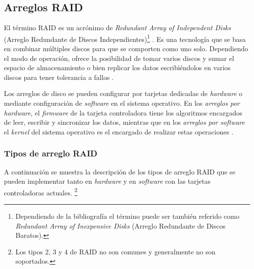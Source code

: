 \newpage
  \subsection {Arreglos RAID}
  \label{Arreglos-RAID}

El t\'{e}rmino \textsc{\gls{RAID}} es un acr\'{o}nimo de \emph{Redundant Array of Independent Disks} (Arreglo Redundante de Discos Independientes)\footnote{Dependiendo de la bibliograf\'{i}a el t\'{e}rmino puede ser tambi\'{e}n referido como \emph{Redundant Array of Inexpensive Disks} (Arreglo Redundante de Discos Baratos).} \cite{_bytepile.com_????}. Es una tecnolog\'{i}a que se basa en combinar m\'{u}ltiples discos para que se comporten como uno solo. Dependiendo el modo de operaci\'{o}n, ofrece la posibilidad de tomar varios discos y sumar el espacio de almacenamiento o bien replicar los datos escribi\'{e}ndolos en varios discos para tener tolerancia a fallos \cite{_raid_????-2}.

Los arreglos de disco se pueden configurar por tarjetas dedicadas de \emph{\gls{hardware}} o mediante configuraci\'{o}n de \emph{\gls{software}} en el sistema operativo. En los \emph{arreglos por \gls{hardware}}, el \emph{\gls{firmware}} de la tarjeta controladora tiene los algoritmos encargados de leer, escribir y sincronizar los datos, mientras que en los \emph{arreglos por \gls{software}} el \textsl{\gls{kernel}} del sistema operativo es el encargado de realizar estas operaciones \cite{_chapter_????}.

\subsubsection*{Tipos de arreglo RAID}

A continuaci\'{o}n se muestra la descripci\'{o}n de los tipos de arreglo \textsc{\gls{RAID}} que se pueden implementar tanto en \emph{\gls{hardware}} y en \emph{\gls{software}} con las tarjetas controladoras actuales. \footnote{Los tipos 2, 3 y 4 de \textsc{\gls{RAID}} no son comunes y generalmente no son soportados.}

